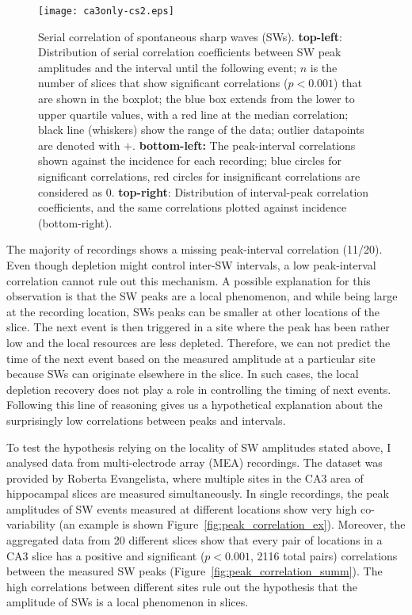     \begin{figure}
      \center
      \texttt{[image: ca3only-cs2.eps]}
      \caption{
        Serial correlation of spontaneous sharp waves (SWs). \textbf{top-left}:
        Distribution of serial correlation coefficients between SW peak
        amplitudes and the interval until the following event; $n$ is the
        number of slices that show significant correlations ($p<0.001$) that
        are shown in the boxplot; the blue box extends from the lower to upper
        quartile values, with a red line at the median correlation; black line
        (whiskers) show the range of the data; outlier datapoints are denoted
        with $+$. \textbf{bottom-left:} The peak-interval correlations shown
        against the incidence for each recording; blue circles for significant
        correlations, red circles for insignificant correlations are considered
        as 0. \textbf{top-right}: Distribution of interval-peak correlation
        coefficients, and the same correlations plotted against incidence
        (bottom-right).
             }
    \label{fig:ca3only_SCsumm}
    \end{figure}

    The majority of recordings shows a missing peak-interval correlation
    (11/20). Even though depletion might control inter-SW intervals, a low
    peak-interval correlation cannot rule out this mechanism. A possible
    explanation for this observation is that the SW peaks are a local
    phenomenon, and while being large at the recording location, SWs peaks can
    be smaller at other locations of the slice. The next event is then
    triggered in a site where the peak has been rather low and the local
    resources are less depleted. Therefore, we can not predict the time of the
    next event based on the measured amplitude at a particular site because SWs
    can originate elsewhere in the slice. In such cases, the local depletion
    recovery does not play a role in controlling the timing of next events.
    Following this line of reasoning gives us a hypothetical explanation about
    the surprisingly low correlations between peaks and intervals.

    To test the hypothesis relying on the locality of SW amplitudes stated
    above, I analysed data from multi-electrode array (MEA) recordings. The
    dataset was provided by Roberta Evangelista, where multiple sites in the
    CA3 area of hippocampal slices are measured simultaneously. In single
    recordings, the peak amplitudes of SW events measured at different
    locations show very high co-variability (an example is shown
    Figure~\ref{fig:peak_correlation_ex}). Moreover, the aggregated data from
    20 different slices show that every pair of locations in a CA3 slice has a
    positive and significant ($p<0.001$, 2116 total pairs) correlations between
    the measured SW peaks (Figure~\ref{fig:peak_correlation_summ}). The high
    correlations between different sites rule out the hypothesis that the
    amplitude of SWs is a local phenomenon in slices.

